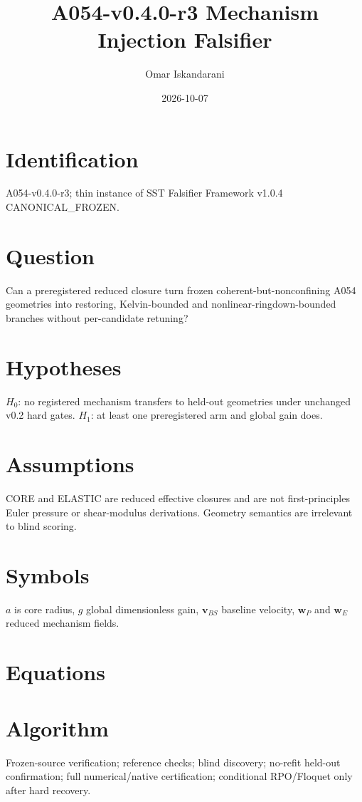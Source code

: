 \documentclass[11pt]{article}
\title{A054-v0.4.0-r3 Mechanism Injection Falsifier}\author{Omar Iskandarani}\date{2026-10-07}
\begin{document}
\maketitle
\section{Identification} A054-v0.4.0-r3; thin instance of SST Falsifier Framework v1.0.4 CANONICAL\_FROZEN.
\section{Question} Can a preregistered reduced closure turn frozen coherent-but-nonconfining A054 geometries into restoring, Kelvin-bounded and nonlinear-ringdown-bounded branches without per-candidate retuning?
\section{Hypotheses} $H_0$: no registered mechanism transfers to held-out geometries under unchanged v0.2 hard gates. $H_1$: at least one preregistered arm and global gain does.
\section{Assumptions} CORE and ELASTIC are reduced effective closures and are not first-principles Euler pressure or shear-modulus derivations. Geometry semantics are irrelevant to blind scoring.
\section{Symbols} $a$ is core radius, $g$ global dimensionless gain, $\mathbf v_{BS}$ baseline velocity, $\mathbf w_P$ and $\mathbf w_E$ reduced mechanism fields.
\section{Equations}
\section{Algorithm} Frozen-source verification; reference checks; blind discovery; no-refit held-out confirmation; full numerical/native certification; conditional RPO/Floquet only after hard recovery.
\end{document}
